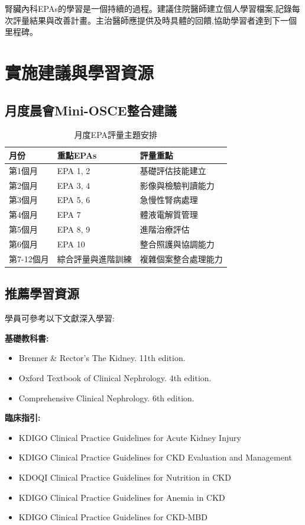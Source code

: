 \documentclass[12pt,a4paper]{article}
\newcommand{\note}[1]{
    \par
    \noindent
    \begin{tcolorbox}[
        colback=nephro_cyan!5!white,
        colframe=nephro_cyan,
        title=\textbf{重點提醒},
        fonttitle=\bfseries,
        boxrule=0.5pt,
        arc=3pt,
        left=6pt,
        right=6pt,
        top=6pt,
        bottom=6pt
    ]
    #1
    \end{tcolorbox}
}
\begin{document}
\vspace{0.5cm}
\note{
腎臟內科EPAs的學習是一個持續的過程。建議住院醫師建立個人學習檔案,記錄每次評量結果與改善計畫。主治醫師應提供及時具體的回饋,協助學習者達到下一個里程碑。
}

\section{實施建議與學習資源}

\subsection{月度晨會Mini-OSCE整合建議}
\begin{table}[h]
    \centering
    \caption{月度EPA評量主題安排}
    \begin{tabular}{p{2.5cm} p{4.5cm} p{7cm}}
        \toprule
        \textbf{月份} & \textbf{重點EPAs} & \textbf{評量重點} \\
        \midrule
        第1個月 & EPA 1, 2 & 基礎評估技能建立 \\
        第2個月 & EPA 3, 4 & 影像與檢驗判讀能力 \\
        第3個月 & EPA 5, 6 & 急慢性腎病處理 \\
        第4個月 & EPA 7 & 體液電解質管理 \\
        第5個月 & EPA 8, 9 & 進階治療評估 \\
        第6個月 & EPA 10 & 整合照護與協調能力 \\
        第7-12個月 & 綜合評量與進階訓練 & 複雜個案整合處理能力 \\
        \bottomrule
    \end{tabular}
\end{table}

\subsection{推薦學習資源}
學員可參考以下文獻深入學習:

\textbf{基礎教科書:}
\begin{itemize}
    \item Brenner \& Rector's The Kidney. 11th edition.
    \item Oxford Textbook of Clinical Nephrology. 4th edition.
    \item Comprehensive Clinical Nephrology. 6th edition.
\end{itemize}

\textbf{臨床指引:}
\begin{itemize}
    \item KDIGO Clinical Practice Guidelines for Acute Kidney Injury
    \item KDIGO Clinical Practice Guidelines for CKD Evaluation and Management
    \item KDOQI Clinical Practice Guidelines for Nutrition in CKD
    \item KDIGO Clinical Practice Guidelines for Anemia in CKD
    \item KDIGO Clinical Practice Guidelines for CKD-MBD
\end{itemize}
\end{document}
